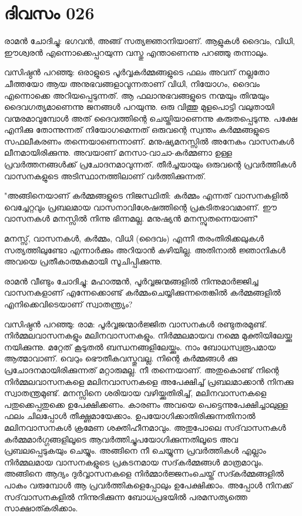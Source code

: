  
\section{ദിവസം 026}


രാമന്‍ ചോദിച്ചു: ഭഗവന്‍, അങ്ങ്‌ സത്യജ്ഞാനിയാണ്‌. ആളുകള്‍ ദൈവം, വിധി, ഈശ്വരന്‍ എന്നൊക്കെപ്പറയുന്ന വസ്തു എന്താണെന്നു പറഞ്ഞു തന്നാലും.

വസിഷ്ഠന്‍ പറഞ്ഞു: ഒരാളുടെ പൂര്‍വ്വകര്‍മ്മങ്ങളുടെ ഫലം അവന്‌ നല്ലതോ ചീത്തയോ ആയ അനുഭവങ്ങളാവുന്നതാണ്‌ വിധി, നിയോഗം, ദൈവം എന്നൊക്കെ അറിയപ്പെടുന്നത്‌. ആ ഫലാനുഭവങ്ങളുടെ നന്മയും തിന്മയും ദൈവഗത്യമാണെന്നു ജനങ്ങള്‍ പറയുന്നു. ഒരു വിത്തു മുളപൊട്ടി വലുതായി വന്മരമാവുമ്പോള്‍ അത്‌ ദൈവത്തിന്റെ ചെയ്തിയാണെന്നു കരുതപ്പെടുന്നു. പക്ഷേ എനിക്കു തോന്നുന്നത്‌ നിയോഗമെന്നത്‌ ഒരുവന്റെ സ്വന്തം കര്‍മ്മങ്ങളുടെ സഫലീകരണം തന്നെയാണെന്നാണ്‌. മനുഷ്യമനസ്സില്‍ അനേകം വാസനകള്‍ ലീനമായിരിക്കുന്നു. അവയാണ്‌ മനസാ-വാചാ-കര്‍മ്മണാ ഉള്ള പ്രവര്‍ത്തനങ്ങള്‍ക്ക്‌ പ്രചോദനമാവുന്നത്‌. തീര്‍ച്ചയായും ഒരുവന്റെ പ്രവര്‍ത്തികള്‍ വാസനകളുടെ അടിസ്ഥാനത്തിലാണ്‌ വര്‍ത്തിക്കുന്നത്‌.

"അങ്ങിനെയാണ്‌ കര്‍മ്മങ്ങളുടെ നിജസ്ഥിതി: കര്‍മ്മം എന്നത്‌ വാസനകളില്‍ വെച്ചേറ്റവും പ്രബലമായ വാസനാവിശേഷത്തിന്റെ പ്രകടിതഭാവമാണ്‌. ഈ വാസനകള്‍ മനസ്സില്‍ നിന്നു ഭിന്നമല്ല. മനുഷ്യന്‍ മനസ്സുതന്നെയാണ്‌" 

മനസ്സ്‌, വാസനകള്‍, കര്‍മ്മം, വിധി (ദൈവം) എന്നീ തരംതിരിക്കലുകള്‍ സത്യത്തിലുണ്ടോ എന്നാര്‍ക്കും അറിയാന്‍ കഴിയില്ല. അതിനാല്‍ ജ്ഞാനികള്‍ അവയെ പ്രതീകാത്മകമായി സൂചിപ്പിക്കുന്നു. 

രാമന്‍ വീണ്ടും ചോദിച്ചു: മഹാത്മന്‍, പൂര്‍വ്വജന്മങ്ങളില്‍ നിന്നുമാര്‍ജ്ജിച്ച വാസനകളാണ്‌ എന്നേക്കൊണ്ട്‌ കര്‍മ്മംചെയ്യിക്കുന്നതെങ്കില്‍ കര്‍മ്മങ്ങളില്‍ എനിക്കെവിടെയാണ്‌ സ്വാതന്ത്ര്യം?

വസിഷ്ഠന്‍ പറഞ്ഞു: രാമ: പൂര്‍വ്വജന്മാര്‍ജ്ജിത വാസനകള്‍ രണ്ടുതരമുണ്ട്‌. നിര്‍മ്മലവാസനകളും മലിനവാസനകളും. നിര്‍മ്മലമായവ നമ്മെ മുക്തിയിലേയ്ക്കു നയിക്കുന്നു. മറ്റേത്‌ കൂടുതല്‍ ബന്ധനങ്ങളിലേയ്ക്കും. നാം ബോധസ്വരൂപമായ ആത്മാവാണ്‌. വെറും ഭൌതീകവസ്തുവല്ല. നിന്റെ കര്‍മ്മങ്ങള്‍ ക്കു പ്രചോദനമായിരിക്കുന്നത്‌ മറ്റാരുമല്ല. നീ തന്നെയാണ്‌. അതുകൊണ്ട്‌ നിന്റെ നിര്‍മ്മലവാസനകളെ മലിനവാസനകളെ അപേക്ഷിച്ച്‌ പ്രബലമാക്കാന്‍ നിനക്കു സ്വാതന്ത്രമുണ്ട്‌. മനസ്സിനെ ശരിയായ വഴിയ്ക്കുതിരിച്ച്‌, മലിനവാസനകളെ പതുക്കെപ്പതുക്കെ ഉപേക്ഷിക്കണം. കാരണം അവയെ പെട്ടെന്നുപേക്ഷിച്ചാലുള്ള ഫലം ചിലപ്പോള്‍ തീക്ഷ്ണമായേക്കാം. ഉപയോഗിക്കാതിരിക്കുന്നതിനാല്‍ മലിനവാസനകള്‍ ക്രമേണ ശക്തിഹീനമാവും. അതുപോലെ സദ്‌വാസനകള്‍ കര്‍മ്മമാര്‍ഗ്ഗങ്ങളിലൂടെ ആവര്‍ത്തിച്ചുപയോഗിക്കുന്നതിലൂടെ അവ പ്രബലപ്പെടുകയും ചെയ്യും. അങ്ങിനെ നീ ചെയ്യുന്ന പ്രവര്‍ത്തികള്‍ എല്ലാം നിര്‍മ്മലമായ വാസനകളുടെ പ്രകടനമായ സദ്‌കര്‍മ്മങ്ങള്‍ മാത്രമാവും. അങ്ങിനെ ആദ്യം ദുര്‍വ്വാസനകളെ നിര്‍മ്മാര്‍ജ്ജനംചെയ്ത്‌ സദ്കര്‍മ്മങ്ങളില്‍ പാകം വരുമ്പോള്‍ ആ പ്രവര്‍ത്തികളെപ്പോലും ഉപേക്ഷിക്കാം. അപ്പോള്‍ നിനക്ക്‌ സദ്‌വാസനകളില്‍ നിന്നുദിക്കുന്ന ബോധപ്രഭയില്‍ പരമസത്യത്തെ സാക്ഷാത്കരിക്കാം.
